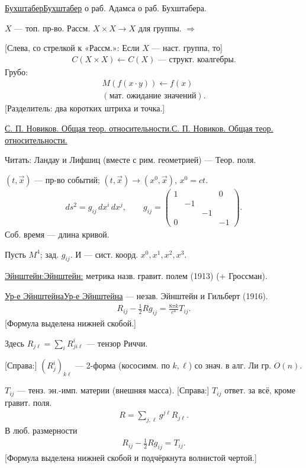 \documentclass[11pt]{article}
\theoremstyle{definition}
\theoremstyle{remark}
\let\DiplomaticMathUnderline\underline
\renewcommand{\underline}[1]{\ifmmode\DiplomaticMathUnderline{#1}\else\uline{#1}\fi}
\begin{document}
\underline{Бухштабер} о раб. Адамса о раб. Бухштабера.

$X$ — топ. пр-во. Рассм. $X\times X\to X$ для группы. $\Rightarrow$

[Слева, со стрелкой к «Рассм.»: Если $X$ — наст. группа, то]
\begin{gather*}
C(X\times X)\leftarrow C(X)\text{ — структ. коалгебры.}
\end{gather*}
Грубо:
\begin{gather*}
M(f(x\cdot y))\leftarrow f(x)\\
(\text{мат. ожидание значений}).
\end{gather*}
[Разделитель: два коротких штриха и точка.]

\underline{С. П. Новиков. Общая теор. относительности.}

Читать: Ландау и Лифшиц (вместе с рим. геометрией) — Теор. поля.

$(t,\vec x)$ — пр-во событий; $(t,\vec x)\to(x^0,\vec x)$, $x^0=ct$.
\begin{gather*}
ds^2=g_{ij}\,dx^i\,dx^j,\qquad
g_{ij}=\begin{pmatrix}1&&&0\\&-1&&\\&&-1&\\0&&&-1\end{pmatrix}.
\end{gather*}
Соб. время — длина кривой.

Пусть $M^4$; зад. $g_{ij}$. И — сист. коорд. $x^0,x^1,x^2,x^3$.

\underline{Эйнштейн:} метрика назв. гравит. полем (1913) (+ Гроссман).

\underline{Ур-е Эйнштейна} — незав. Эйнштейн и Гильберт (1916).
\begin{gather*}
R_{ij}-\frac12Rg_{ij}=\frac{8\pi k}{c^4}T_{ij}.
\end{gather*}
[Формула выделена нижней скобой.]

Здесь $R_{j\ell}=\sum_i R^i_{ji\ell}$ — тензор Риччи.

[Справа:] $(R^i_j)_{k\ell}$ — 2-форма (кососимм. по $k,\ell$) со знач. в алг. Ли гр. $O(n)$.

$T_{ij}$ — тенз. эн.-имп. материи (внешняя масса).
[Справа:] $T_{ij}$ ответ. за всё, кроме гравит. поля.
\begin{gather*}
R=\sum_{j,\ell}g^{j\ell}R_{j\ell}.
\end{gather*}
В люб. размерности
\begin{gather*}
R_{ij}-\frac12Rg_{ij}=T_{ij}.
\end{gather*}
[Формула выделена нижней скобой и подчёркнута волнистой чертой.]
\end{document}
